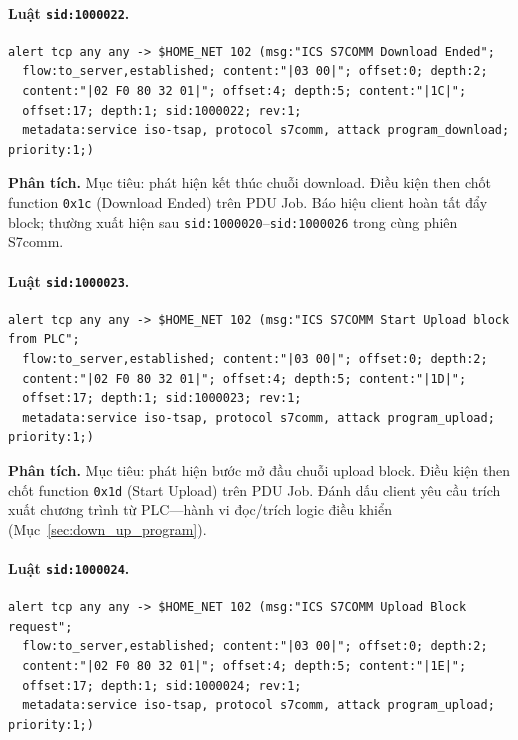 \documentclass[../main.tex]{subfiles}
\begin{document}
\paragraph{Luật \texttt{sid:1000022}.}
\begin{footnotesize}
\begin{verbatim}
alert tcp any any -> $HOME_NET 102 (msg:"ICS S7COMM Download Ended";
  flow:to_server,established; content:"|03 00|"; offset:0; depth:2;
  content:"|02 F0 80 32 01|"; offset:4; depth:5; content:"|1C|";
  offset:17; depth:1; sid:1000022; rev:1;
  metadata:service iso-tsap, protocol s7comm, attack program_download; priority:1;)
\end{verbatim}
\end{footnotesize}

\noindent\textbf{Phân tích.}
Mục tiêu: phát hiện kết thúc chuỗi download. Điều kiện then chốt function \texttt{0x1c} (Download Ended) trên PDU Job. Báo hiệu client hoàn tất đẩy block; thường xuất hiện sau \texttt{sid:1000020}--\texttt{sid:1000026} trong cùng phiên S7comm.

\paragraph{Luật \texttt{sid:1000023}.}
\begin{footnotesize}
\begin{verbatim}
alert tcp any any -> $HOME_NET 102 (msg:"ICS S7COMM Start Upload block from PLC";
  flow:to_server,established; content:"|03 00|"; offset:0; depth:2;
  content:"|02 F0 80 32 01|"; offset:4; depth:5; content:"|1D|";
  offset:17; depth:1; sid:1000023; rev:1;
  metadata:service iso-tsap, protocol s7comm, attack program_upload; priority:1;)
\end{verbatim}
\end{footnotesize}

\noindent\textbf{Phân tích.}
Mục tiêu: phát hiện bước mở đầu chuỗi upload block. Điều kiện then chốt function \texttt{0x1d} (Start Upload) trên PDU Job. Đánh dấu client yêu cầu trích xuất chương trình từ PLC---hành vi đọc/trích logic điều khiển (Mục~\ref{sec:down_up_program}).

\paragraph{Luật \texttt{sid:1000024}.}
\begin{footnotesize}
\begin{verbatim}
alert tcp any any -> $HOME_NET 102 (msg:"ICS S7COMM Upload Block request";
  flow:to_server,established; content:"|03 00|"; offset:0; depth:2;
  content:"|02 F0 80 32 01|"; offset:4; depth:5; content:"|1E|";
  offset:17; depth:1; sid:1000024; rev:1;
  metadata:service iso-tsap, protocol s7comm, attack program_upload; priority:1;)
\end{verbatim}
\end{footnotesize}
\end{document}
